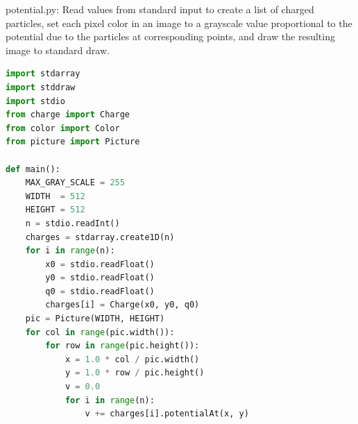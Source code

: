 \documentclass[8pt,a4paper,compress]{beamer}
\begin{document}
\begin{frame}[fragile]
\pause

\begin{framed}
\tiny potential.py: Read values from standard input to create a list of charged particles, set each pixel color in an image to a grayscale value proportional to the potential due to the particles at corresponding points, and draw the resulting image to standard draw.
\end{framed}

\begin{lstlisting}[language=Python,style=focusin]
import stdarray
import stddraw
import stdio
from charge import Charge
from color import Color
from picture import Picture

def main():
    MAX_GRAY_SCALE = 255
    WIDTH  = 512
    HEIGHT = 512
    n = stdio.readInt()
    charges = stdarray.create1D(n)
    for i in range(n):
        x0 = stdio.readFloat()
        y0 = stdio.readFloat()
        q0 = stdio.readFloat()
        charges[i] = Charge(x0, y0, q0)
    pic = Picture(WIDTH, HEIGHT)
    for col in range(pic.width()):
        for row in range(pic.height()):
            x = 1.0 * col / pic.width()
            y = 1.0 * row / pic.height()
            v = 0.0
            for i in range(n):
                v += charges[i].potentialAt(x, y)    
\end{lstlisting}
\end{frame}
\end{document}
